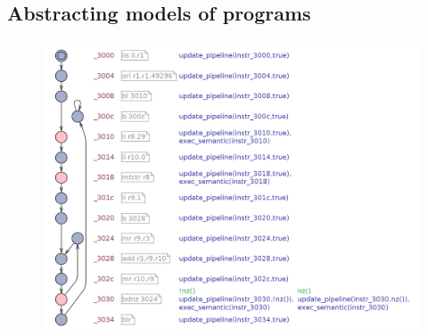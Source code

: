 \documentclass{beamer}
\begin{document}
  \subsection{Abstracting models of programs}
  \begin{frame}
    \frametitle{\secname}
    \framesubtitle{\subsecname}

    \begin{figure}
      \centering
      \includegraphics[height=.85\textheight]{fig/example.png}
    \end{figure}


        
      
  \end{frame}
\end{document}
